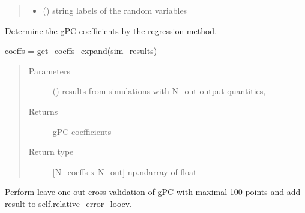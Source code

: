 \documentclass[letterpaper,10pt,english,openany,oneside]{sphinxmanual}
\begin{document}
\begin{fulllineitems}
\begin{quote}
\begin{description}
\begin{itemize}
\item {} 
 (\sphinxstyleliteralemphasis{\sphinxupquote{{[}}}\sphinxstyleliteralemphasis{\sphinxupquote{{]} }}\sphinxstyleliteralemphasis{\sphinxupquote{, }}\sphinxstyleliteralemphasis{\sphinxupquote{, }}) \textendash{} string labels of the random variables

\end{itemize}

\end{description}\end{quote}

\begin{fulllineitems}
\label{\detokenize{pygpc:pygpc.reg.Reg.get_coeffs_expand}}
Determine the gPC coefficients by the regression method.

coeffs = get\_coeffs\_expand(sim\_results)
\begin{quote}\begin{description}
\item[{Parameters}] \leavevmode
{} (\sphinxstyleliteralemphasis{\sphinxupquote{{[}}}\sphinxstyleliteralemphasis{\sphinxupquote{{]} }}) \textendash{} results from simulations with N\_out output quantities,

\item[{Returns}] \leavevmode
{} \textendash{} gPC coefficients

\item[{Return type}] \leavevmode
{[}N\_coeffs x N\_out{]} np.ndarray of float

\end{description}\end{quote}

\end{fulllineitems}


\begin{fulllineitems}
\label{\detokenize{pygpc:pygpc.reg.Reg.get_loocv}}
Perform leave one out cross validation of gPC with maximal 100 points
and add result to self.relative\_error\_loocv.


\end{fulllineitems}
\end{fulllineitems}
\end{document}
